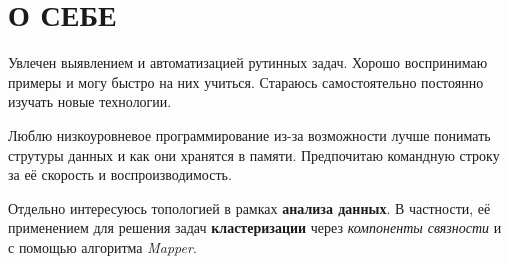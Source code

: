 \section{О СЕБЕ}

Увлечен выявлением и автоматизацией рутинных задач. Хорошо воспринимаю
примеры и могу быстро на них учиться. Стараюсь самостоятельно
постоянно изучать новые технологии.

Люблю низкоуровневое программирование из-за возможности лучше понимать
струтуры данных и как они хранятся в памяти. Предпочитаю командную
строку за её скорость и воспроизводимость.

Отдельно интересуюсь топологией в рамках \textbf{анализа данных}. В
частности, её применением для решения задач \textbf{кластеризации}
через \textit{компоненты связности} и с помощью алгоритма
\textit{Mapper}.

